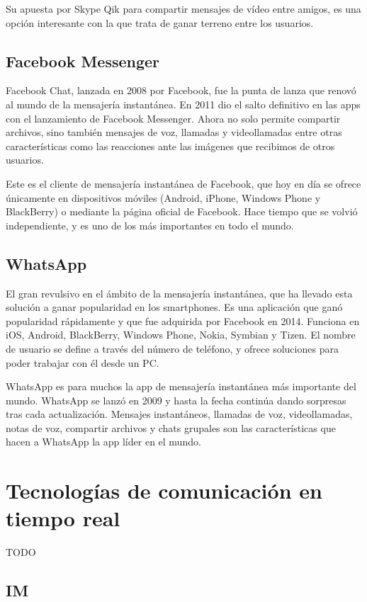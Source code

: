 Su apuesta por Skype Qik para compartir mensajes de vídeo entre amigos, es una opción interesante con la que trata de ganar terreno entre los usuarios.

\subsection{Facebook Messenger}

Facebook Chat, lanzada en 2008 por Facebook, fue la punta de lanza que renovó al mundo de la mensajería instantánea. En 2011 dio el salto definitivo en las apps con el lanzamiento de Facebook Messenger. Ahora no solo permite compartir archivos, sino también mensajes de voz, llamadas y videollamadas entre otras características como las reacciones ante las imágenes que recibimos de otros usuarios.

Este es el cliente de mensajería instantánea de Facebook, que hoy en día se ofrece únicamente en dispositivos móviles (Android, iPhone, Windows Phone y BlackBerry) o mediante la página oficial de Facebook. Hace tiempo que se volvió independiente, y es uno de los más importantes en todo el mundo.

\subsection{WhatsApp}

El gran revulsivo en el ámbito de la mensajería instantánea, que ha llevado esta solución a ganar popularidad en los smartphones. Es una aplicación que ganó popularidad rápidamente y que fue adquirida por Facebook en 2014. Funciona en iOS, Android, BlackBerry, Windows Phone, Nokia, Symbian y Tizen. El nombre de usuario se define a través del número de teléfono, y ofrece soluciones para poder trabajar con él desde un PC.

WhatsApp es para muchos la app de mensajería instantánea más importante del mundo. WhatsApp se lanzó en 2009 y hasta la fecha continúa dando sorpresas tras cada actualización. Mensajes instantáneos, llamadas de voz, videollamadas, notas de voz, compartir archivos y chats grupales son las características que hacen a WhatsApp la app líder en el mundo.

\section{Tecnologías de comunicación en tiempo real}

TODO

\subsection{IM}

